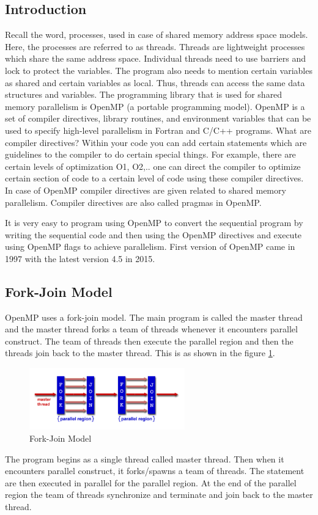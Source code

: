 \documentclass[12pt]{book}
\begin{document}
\subsection{Introduction}
Recall the word, processes, used in case of shared memory address space models. Here, the processes are referred to as threads.
Threads are lightweight processes which share the same address space. Individual threads need to use barriers and lock to protect the variables. 
The program also needs to mention certain variables as shared and certain variables as local. 
Thus, threads can access the same data structures and variables. The programming library that is used for shared memory parallelism is OpenMP (a portable programming model).
OpenMP is a set of compiler directives, library routines, and environment variables that can be used to specify high-level parallelism in Fortran and C/C++ programs.
What are compiler directives? Within your code you can add certain statements which are guidelines to the compiler to do certain special things.
For example, there are certain levels of optimization O1, O2,.. one can direct the compiler to optimize certain section of code to a certain level of code using these compiler directives.
In case of OpenMP compiler directives are given related to shared memory parallelism. Compiler directives are also called pragmas in OpenMP.

It is very easy to program using OpenMP to convert the sequential program by writing the sequential code and then using the OpenMP directives and execute using OpenMP flags to achieve parallelism.
First version of OpenMP came in 1997 with the latest version 4.5 in 2015.

\subsection{Fork-Join Model}
OpenMP uses a fork-join model. The main program is called the master thread and the master thread forks a team of threads whenever it encounters parallel construct. The team of threads then execute the parallel region and 
then the threads join back to the master thread.
This is as shown in the figure \ref{fig:forkjoin}.
\begin{figure}[H]
    \centering
    \includegraphics[width=0.6\textwidth]{images/forkjoin.png}
    \caption{Fork-Join Model}
    \label{fig:forkjoin}
\end{figure}
The program begins as a single thread called master thread. Then when it encounters parallel construct, it forks/spawns
a team of threads. The statement are then executed in parallel for the parallel region. At the end of the parallel region the team of threads synchronize and terminate and join
back to the master thread.
\end{document}
